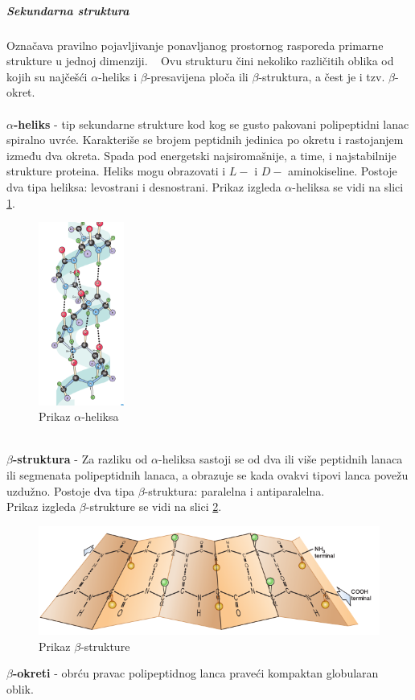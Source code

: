 \documentclass[a4paper]{article}
\begin{document}
\subparagraph{Sekundarna struktura}
Označava pravilno pojavljivanje ponavljanog prostornog rasporeda primarne strukture u jednoj dimenziji. ~\cite{medbio}
Ovu strukturu čini nekoliko različitih oblika od kojih su najčešći $\alpha$-heliks i $\beta$-presavijena ploča ili $\beta$-struktura, a čest je i tzv. $\beta$-okret.\\\\
\textbf{$\alpha$-heliks} - tip sekundarne strukture kod kog se gusto pakovani polipeptidni lanac spiralno uvrće. Karakteriše se brojem peptidnih jedinica po okretu i rastojanjem između dva okreta. Spada pod energetski najsiromašnije, a time, i najstabilnije strukture proteina. Heliks mogu obrazovati i $L-$ i $D-$ aminokiseline. Postoje dva tipa heliksa: levostrani i desnostrani. Prikaz izgleda $\alpha$-heliksa se vidi na slici \ref{fig:aheliks}.
\begin{figure}[h]
	\centering
    \includegraphics[width=0.25\textwidth]{Pictures/ahelix.png}
    \caption{Prikaz $\alpha$-heliksa~\cite{bmbg}}
    \label{fig:aheliks}
\end{figure}
 \\
\textbf{$\beta$-struktura} - Za razliku od $\alpha$-heliksa sastoji se od dva ili više peptidnih lanaca ili segmenata polipeptidnih lanaca, a obrazuje se kada ovakvi tipovi lanca povežu uzdužno. Postoje dva tipa $\beta$-struktura: paralelna i antiparalelna. ~\cite{spasic} \\
Prikaz izgleda $\beta$-strukture se vidi na slici \ref{fig:beta}.
\begin{figure}[h]
	\centering
    \includegraphics[width=1\textwidth]{Pictures/beta.png}
    \caption{Prikaz $\beta$-strukture~\cite{bmbg}}
    \label{fig:beta}
\end{figure}
\textbf{$\beta$-okreti} - obrću pravac polipeptidnog lanca praveći kompaktan globularan oblik.~\cite{lippincott} 
 
\end{document}
